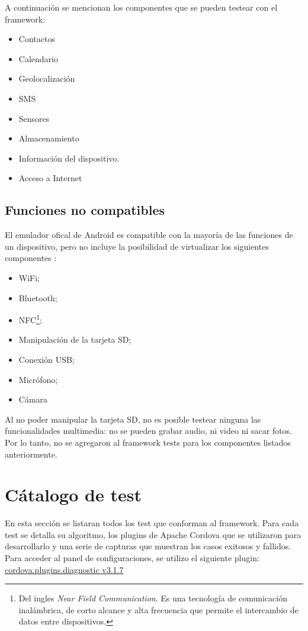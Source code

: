 A continuación se mencionan los componentes que se pueden testear con el framework:
\begin{itemize}
	\item Contactos
	\item Calendario
	\item Geolocalización
	\item SMS
	\item Sensores
	\item Almacenamiento
	\item Información del dispositivo.
	\item Acceso a Internet
\end{itemize}
\subsection{Funciones no compatibles}
El emulador ofical de Android es compatible con la mayoría de las funciones de un dispositivo, pero no incluye la posibilidad de virtualizar los siguientes componentes \cite{daemu}:
\begin{itemize}
    \item WiFi;
    \item Bluetooth;
    \item NFC\footnote{Del ingles \emph{Near Field Communication}. Es una tecnología de comunicación inalámbrica, de corto alcance y alta frecuencia que permite el intercambio de datos entre dispositivos.};
    \item Manipulación de la tarjeta SD;
    \item Conexión USB;
    \item Micrófono;
    \item Cámara
\end{itemize}
Al no poder manipular la tarjeta SD, no es posible testear ninguna las funcionalidades multimedia: no se pueden grabar audio, ni video ni sacar fotos.\\
Por lo tanto, no se agregaron al framework tests para los componentes listados anteriormente.
\section{Cátalogo de test}
En esta sección se listaran todos los test que conforman al framework. Para cada test se detalla su algoritmo, los plugins de Apache Cordova que se utilizaron para desarrollarlo y una serie de capturas que muestran los casos exitosos y fallidos.\\
Para acceder al panel de configuraciones, se utilizo el siguiente plugin:\\ \href{https://www.npmjs.com/package/cordova.plugins.diagnostic}{cordova.plugins.diagnostic v3.1.7}
